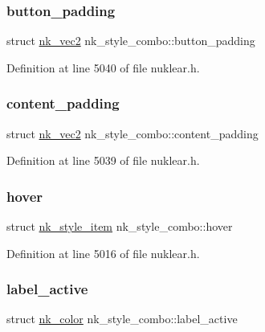 \subsubsection{\texorpdfstring{button\+\_\+padding}{button\_padding}}
{\footnotesize\ttfamily struct \mbox{\hyperlink{structnk__vec2}{nk\+\_\+vec2}} nk\+\_\+style\+\_\+combo\+::button\+\_\+padding}



Definition at line 5040 of file nuklear.\+h.

\mbox{\label{structnk__style__combo_a30a280e81ec452d7cd28be4fbc2e4255}} 
\subsubsection{\texorpdfstring{content\+\_\+padding}{content\_padding}}
{\footnotesize\ttfamily struct \mbox{\hyperlink{structnk__vec2}{nk\+\_\+vec2}} nk\+\_\+style\+\_\+combo\+::content\+\_\+padding}



Definition at line 5039 of file nuklear.\+h.

\mbox{\label{structnk__style__combo_a7e43251b99975c9ec8069e77468698c1}} 
\subsubsection{\texorpdfstring{hover}{hover}}
{\footnotesize\ttfamily struct \mbox{\hyperlink{structnk__style__item}{nk\+\_\+style\+\_\+item}} nk\+\_\+style\+\_\+combo\+::hover}



Definition at line 5016 of file nuklear.\+h.

\mbox{\label{structnk__style__combo_a2b901e453b2f00de9c4ac0b7f5a4d975}} 
\subsubsection{\texorpdfstring{label\+\_\+active}{label\_active}}
{\footnotesize\ttfamily struct \mbox{\hyperlink{structnk__color}{nk\+\_\+color}} nk\+\_\+style\+\_\+combo\+::label\+\_\+active}



